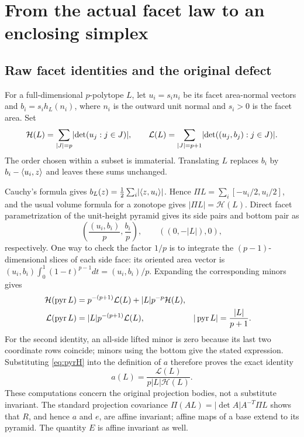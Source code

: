 \section{From the actual facet law to an enclosing simplex}
\label{sec:enclosure}
\subsection{Raw facet identities and the original defect}\label{prop:actual-moments}
For a full-dimensional $p$-polytope $L$, let $u_i=s_i n_i$ be its
facet area-normal vectors and $b_i=s_i h_L(n_i)$, where $n_i$ is the
outward unit normal and $s_i>0$ is the facet area. Set
\begin{equation}\label{eq:rawsums}
 \mathcal H(L)=\sum_{|J|=p}\lvert \det(u_j:j\in J)\rvert,\qquad
 \mathcal L(L)=\sum_{|J|=p+1}\lvert \det((u_j,b_j):j\in J)\rvert.
\end{equation}
The order chosen within a subset is immaterial. Translating $L$ replaces
$b_i$ by $b_i-\langle u_i,z\rangle$ and leaves these sums unchanged.

Cauchy's formula gives $b_L(z)=\frac12\sum_i\lvert \langle z,u_i\rangle\rvert$.
Hence $\Pi L=\sum_i[-u_i/2,u_i/2]$, and the usual volume formula for a
zonotope gives $|\Pi L|=\mathcal H(L)$. Direct facet parametrization of the
unit-height pyramid gives its side pairs and bottom pair as
\begin{equation}\label{eq:pyrfacets}
 \left(\frac{(u_i,b_i)}p,\frac{b_i}p\right),\qquad ((0,-|L|),0),
\end{equation}
respectively. One way to check the factor $1/p$ is to integrate the
$(p-1)$-dimensional slices of each side face: its oriented area vector is
$(u_i,b_i)\int_0^1(1-t)^{p-1}dt=(u_i,b_i)/p$.
Expanding the corresponding minors gives
\begin{align}
 \mathcal H(\operatorname{pyr} L)&=p^{-(p+1)}\mathcal L(L)
                     +|L|p^{-p}\mathcal H(L),\label{eq:pyrH}\\
 \mathcal L(\operatorname{pyr} L)&=|L|p^{-(p+1)}\mathcal L(L),
 &|\operatorname{pyr} L|&=\frac{|L|}{p+1}.\label{eq:pyrL}
\end{align}
For the second identity, an all-side lifted minor is zero because its
last two coordinate rows coincide; minors using the bottom give the
stated expression. Substituting \eqref{eq:pyrH} into the definition of $a$
therefore proves the exact identity
\begin{equation}\label{eq:a_raw}
 a(L)=\frac{\mathcal L(L)}{p|L|\mathcal H(L)}.
\end{equation}
These computations concern the original projection bodies, not a substitute
invariant. The standard projection covariance
$\Pi(AL)=|\det A|A^{-T}\Pi L$ shows that $R$, and hence $a$ and $e$,
are affine invariant; affine maps of a base extend to its pyramid.
The quantity $E$ is affine invariant as well.

